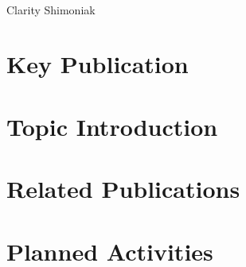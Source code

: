 \documentclass[12pt,letterpaper,english]{article}
\begin{document}
\begin{center}
	{\Huge\todo[Title]} \\
	Clarity Shimoniak
\end{center}

\section*{Key Publication}

\nocite{main}
\printbibliography[heading=none, keyword=main]


\section*{Topic Introduction}



\section*{Related Publications}

\nocite{phipps2023pre}
\nocite{baedorf2023reverse}
\nocite{aydin2023fpga}
\nocite{pistellato2023quantization}
\nocite{madineni2023parameterizable}
\nocite{naufal2023comparative}
\nocite{yan2023end}
\nocite{iandola2016squeezenet}
\nocite{howard2017mobilenets}
\nocite{sandler2018mobilenetv2}
\nocite{zhang2018shufflenet}
\nocite{mehta2018espnet}
\nocite{yaozong2019design}
\nocite{bingchen2019fpga}
\nocite{binfeng2019design}
\nocite{hui2021convolutional}
\printbibliography[heading=none, notkeyword=main]


\section*{Planned Activities}

\end{document}
